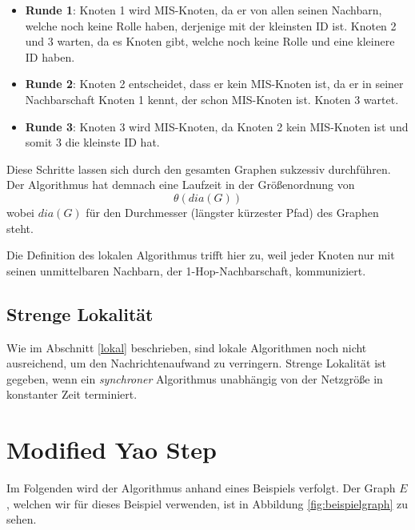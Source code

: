 \documentclass[a4paper,twoside]{IEEEtran}
\begin{document}
\begin{itemize}
\item \textbf{Runde 1}: Knoten 1 wird MIS-Knoten, da er von allen seinen Nachbarn, welche noch keine Rolle haben, derjenige mit der kleinsten ID ist. Knoten 2 und 3 warten, da es Knoten gibt, welche noch keine Rolle und eine kleinere ID haben.

\item \textbf{Runde 2}: Knoten 2 entscheidet, dass er kein MIS-Knoten ist, da er in seiner Nachbarschaft Knoten 1 kennt, der schon MIS-Knoten ist. Knoten 3 wartet.

\item \textbf{Runde 3}: Knoten 3 wird MIS-Knoten, da Knoten 2 kein MIS-Knoten ist und somit 3 die kleinste ID hat. 
\end{itemize}

Diese Schritte lassen sich durch den gesamten Graphen sukzessiv durchführen. 
Der Algorithmus hat demnach eine Laufzeit in der Größenordnung von 
\begin{equation*}
\theta (dia(G)) 
\end{equation*}
wobei $dia(G) $ für den Durchmesser (längster kürzester Pfad) des Graphen steht.

Die Definition des lokalen Algorithmus trifft hier zu, weil jeder Knoten nur mit seinen unmittelbaren Nachbarn, der 1-Hop-Nachbarschaft, kommuniziert.






\subsection{Strenge Lokalität}
Wie im Abschnitt \ref{lokal} beschrieben, sind lokale Algorithmen noch nicht ausreichend, um den Nachrichtenaufwand zu verringern.
Strenge Lokalität ist gegeben, wenn ein \emph{synchroner} Algorithmus unabhängig von der Netzgröße in konstanter Zeit terminiert.



\section{Modified Yao Step}
Im Folgenden wird der Algorithmus anhand eines Beispiels verfolgt.
Der Graph $E $, welchen wir für dieses Beispiel verwenden, ist in Abbildung \ref{fig:beispielgraph} zu sehen.
\end{document}
